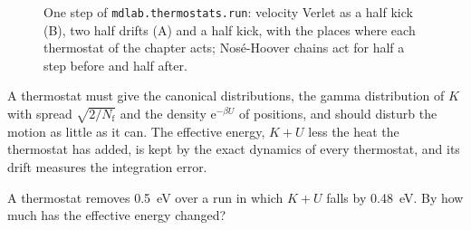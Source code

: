 \begin{figure}[htb]
\centering
{}
\caption{One step of \texttt{mdlab.thermostats.run}: velocity Verlet as a
half kick (B), two half drifts (A) and a half kick, with the places where
each thermostat of the chapter acts; Nosé-Hoover chains act for half a
step before and half after.}
\label{fig:th-step}
\end{figure}

\begin{keyidea}
A thermostat must give the canonical distributions, the gamma
distribution of $K$ with spread $\sqrt{2/N_{\mathrm f}}$ and the density
$\mathrm{e}^{-\beta U}$ of positions, and should disturb the motion as
little as it can. The effective energy, $K + U$ less the heat the
thermostat has added, is kept by the exact dynamics of every thermostat,
and its drift measures the integration error.
\end{keyidea}

\begin{selfcheck}
A thermostat removes \SI{0.5}{\electronvolt} over a run in which $K + U$
falls by \SI{0.48}{\electronvolt}. By how much has the effective energy
changed?
\end{selfcheck}

